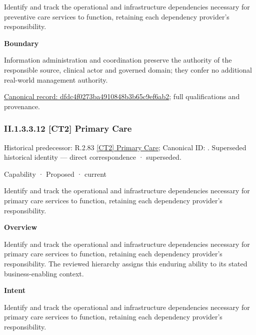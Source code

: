 Identify and track the operational and infrastructure dependencies necessary for preventive care services to function, retaining each dependency provider's responsibility.



\textbf{Boundary}



Information administration and coordination preserve the authority of the responsible source, clinical actor and governed domain; they confer no additional real-world management authority.


{\footnotesize \href{../../../../../../../continuum/strategy/capability/dfdc4f0273ba4910848b3b65c9ef6ab2.md}{Canonical record: dfdc4f0273ba4910848b3b65c9ef6ab2}; full qualifications and provenance.}\par
\subsubsection*{II.1.3.3.12 [CT2] Primary Care}
\label{navigation:II.1.3.3.12}

{\small Historical predecessor: R.2.83 \hyperref[element:fe9d58b5cfe14e8cb7a83a1ac6686d65]{[CT2] Primary Care}; Canonical ID: \texttt{}. Superseded historical identity — direct correspondence · superseded.}\par
\label{element:d118673d77d74c8cb8cec24f03adddd8}
{\small Capability · Proposed · current}\par

Identify and track the operational and infrastructure dependencies necessary for primary care services to function, retaining each dependency provider's responsibility.



\textbf{Overview}



Identify and track the operational and infrastructure dependencies necessary for primary care services to function, retaining each dependency provider's responsibility. The reviewed hierarchy assigns this enduring ability to its stated business-enabling context.



\textbf{Intent}



Identify and track the operational and infrastructure dependencies necessary for primary care services to function, retaining each dependency provider's responsibility.



